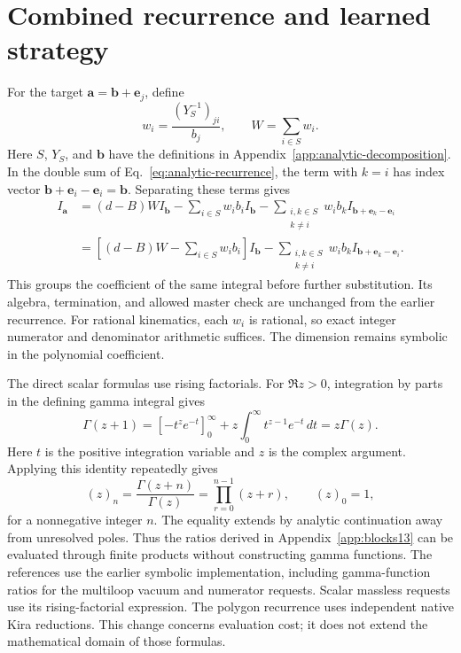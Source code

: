 \section{Combined recurrence and learned strategy}
\label{app:fast-method}
For the target $\boldsymbol a=\boldsymbol b+\boldsymbol e_j$, define
\begin{equation}
 w_i=\frac{(Y_S^{-1})_{ji}}{b_j},\qquad
 W=\sum_{i\in S}w_i.
\end{equation}
Here $S$, $Y_S$, and $\boldsymbol b$ have the definitions in Appendix~\ref{app:analytic-decomposition}. In the double sum of Eq.~\eqref{eq:analytic-recurrence}, the term with $k=i$ has index vector $\boldsymbol b+\boldsymbol e_i-\boldsymbol e_i=\boldsymbol b$. Separating these terms gives
\begin{align}
 I_{\boldsymbol a}
 &= (d-B)W I_{\boldsymbol b}
    -\sum_{i\in S}w_i b_i I_{\boldsymbol b}
    -\sum_{\substack{i,k\in S\\k\ne i}}w_i b_k
       I_{\boldsymbol b+\boldsymbol e_k-\boldsymbol e_i}\\
 &=\left[(d-B)W-\sum_{i\in S}w_i b_i\right]I_{\boldsymbol b}
    -\sum_{\substack{i,k\in S\\k\ne i}}w_i b_k
       I_{\boldsymbol b+\boldsymbol e_k-\boldsymbol e_i}.
 \label{eq:fast-recurrence}
\end{align}
This groups the coefficient of the same integral before further substitution. Its algebra, termination, and allowed master check are unchanged from the earlier recurrence. For rational kinematics, each $w_i$ is rational, so exact integer numerator and denominator arithmetic suffices. The dimension remains symbolic in the polynomial coefficient.

The direct scalar formulas use rising factorials. For $\Re z>0$, integration by parts in the defining gamma integral gives
\begin{equation}
 \Gamma(z+1)=[-t^ze^{-t}]_0^\infty
 +z\int_0^\infty t^{z-1}e^{-t}\,dt=z\Gamma(z).
\end{equation}
Here $t$ is the positive integration variable and $z$ is the complex argument. Applying this identity repeatedly gives
\begin{equation}
 (z)_n=\frac{\Gamma(z+n)}{\Gamma(z)}
      =\prod_{r=0}^{n-1}(z+r),\qquad (z)_0=1,
 \label{eq:fast-product}
\end{equation}
for a nonnegative integer $n$. The equality extends by analytic continuation away from unresolved poles. Thus the ratios derived in Appendix~\ref{app:blocks13} can be evaluated through finite products without constructing gamma functions. The references use the earlier symbolic implementation, including gamma-function ratios for the multiloop vacuum and numerator requests. Scalar massless requests use its rising-factorial expression. The polygon recurrence uses independent native Kira reductions. This change concerns evaluation cost; it does not extend the mathematical domain of those formulas.

